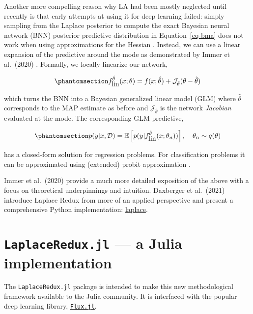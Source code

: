 \documentclass{juliacon}
\begin{document}
Another more compelling reason why LA had been mostly neglected until
recently is that early attempts at using it for deep learning failed:
simply sampling from the Laplace posterior to compute the exact Bayesian
neural network (BNN) posterior predictive distribution in
Equation~\ref{eq-bma} does not work when using approximations for the
Hessian \cite{lawrence2001variational}. Instead, we can use a linear
expansion of the predictive around the mode as demonstrated by Immer et
al.~(2020) \cite{immer2020improving}. Formally, we locally linearize our
network,

\begin{equation}\phantomsection\label{eq-glm}{
f^{\hat{\theta}}_{\mbox{lin}}(x;\theta)=f(x;\hat{\theta}) + \mathcal{J}_{\hat{\theta}}(\theta-\hat{\theta})
}\end{equation}

which turns the BNN into a Bayesian generalized linear model (GLM) where
\(\hat{\theta}\) corresponds to the MAP estimate as before and
\(\mathcal{J}_{\hat{\theta}}\) is the network \emph{Jacobian}
\cite{immer2020improving} evaluated at the mode. The corresponding GLM
predictive,

\begin{equation}\phantomsection\label{eq-glm-predictive}{
p(y|x,\mathcal{D}) = \mathbb{E} \left[ p(y|f^{\hat{\theta}}_{\mbox{lin}}(x;\theta_n)) \right], \ \ \ \theta_n \sim q(\theta)
}\end{equation}

has a closed-form solution for regression problems. For classification
problems it can be approximated using (extended) probit approximation
\cite{daxberger2021laplace}.

Immer et al.~(2020) \cite{immer2020improving} provide a much more
detailed exposition of the above with a focus on theoretical
underpinnings and intuition. Daxberger et al.~(2021)
\cite{daxberger2021laplace} introduce Laplace Redux from more of an
applied perspective and present a comprehensive Python implementation:
\href{https://aleximmer.github.io/Laplace/}{laplace}.

\section{\texorpdfstring{\texttt{LaplaceRedux.jl} --- a Julia
implementation}{LaplaceRedux.jl --- a Julia implementation}}\label{laplaceredux.jl-a-julia-implementation}

The \texttt{LaplaceRedux.jl} package is intended to make this new
methodological framework available to the Julia community. It is
interfaced with the popular deep learning library,
\href{https://fluxml.ai/}{\texttt{Flux.jl}}.
\end{document}
